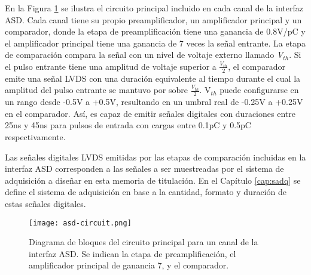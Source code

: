 En la Figura \ref{img:asd-circuit} se ilustra el circuito principal incluido en cada canal de la interfaz ASD. Cada canal tiene su propio preamplificador, un amplificador principal y un comparador\cite{1999ATLASICs}, donde la etapa de preamplificación tiene una ganancia de 0.8V/pC y el amplificador principal tiene una ganancia de 7 veces la señal entrante. La etapa de comparación compara la señal con un nivel de voltaje externo llamado \textit{V$_{th}$}. Si el pulso entrante tiene una amplitud de voltaje superior a $\frac{V_{th}}{2}$, el comparador emite una señal LVDS con una duración equivalente al tiempo durante el cual la amplitud del pulso entrante se mantuvo por sobre $\frac{V_{th}}{2}$. V$_{th}$ puede configurarse en un rango desde -0.5V a +0.5V, resultando en un umbral real de -0.25V a +0.25V en el comparador\cite{1999ATLASICs}. Así, es capaz de emitir señales digitales con duraciones entre 25ns y 45ns para pulsos de entrada con cargas entre 0.1pC y 0.5pC respectivamente.

Las señales digitales LVDS emitidas por las etapas de comparación incluidas en la interfaz ASD corresponden a las señales a ser muestreadas por el sistema de adquisición a diseñar en esta memoria de titulación. En el Capítulo \ref{cap:sadq} se define el sistema de adquisición en base a la cantidad, formato y duración de estas señales digitales.

\begin{figure}[h]
	\centering
	\texttt{[image: asd-circuit.png]}
	\caption{Diagrama de bloques del circuito principal para un canal de la interfaz ASD. Se indican la etapa de preamplificación, el amplificador principal de ganancia 7, y el comparador.}
	\label{img:asd-circuit}
\end{figure}



